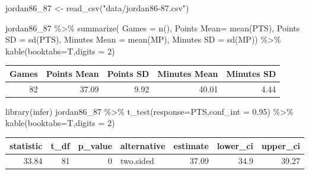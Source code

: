 \documentclass[
  11pt,
]{book}
\newenvironment{Shaded}{\begin{snugshade}}{\end{snugshade}}
\newcommand{\AttributeTok}[1]{\textcolor[rgb]{0.77,0.63,0.00}{#1}}
\newcommand{\DecValTok}[1]{\textcolor[rgb]{0.00,0.00,0.81}{#1}}
\newcommand{\FloatTok}[1]{\textcolor[rgb]{0.00,0.00,0.81}{#1}}
\newcommand{\FunctionTok}[1]{\textcolor[rgb]{0.00,0.00,0.00}{#1}}
\newcommand{\NormalTok}[1]{#1}
\newcommand{\OtherTok}[1]{\textcolor[rgb]{0.56,0.35,0.01}{#1}}
\newcommand{\SpecialCharTok}[1]{\textcolor[rgb]{0.00,0.00,0.00}{#1}}
\newcommand{\StringTok}[1]{\textcolor[rgb]{0.31,0.60,0.02}{#1}}
\theoremstyle{definition}
\theoremstyle{definition}
\theoremstyle{definition}
\theoremstyle{definition}
\theoremstyle{remark}
\begin{document}
\vfill

\newpage

\begin{Shaded}
\begin{Highlighting}[]
\NormalTok{jordan86\_87 }\OtherTok{\textless{}{-}} \FunctionTok{read\_csv}\NormalTok{(}\StringTok{"data/jordan86{-}87.csv"}\NormalTok{)}

\NormalTok{jordan86\_87 }\SpecialCharTok{\%\textgreater{}\%} \FunctionTok{summarize}\NormalTok{(}
  \AttributeTok{Games =} \FunctionTok{n}\NormalTok{(), }
  \StringTok{\textasciigrave{}}\AttributeTok{Points Mean}\StringTok{\textasciigrave{}}\OtherTok{=} \FunctionTok{mean}\NormalTok{(PTS),}
  \StringTok{\textasciigrave{}}\AttributeTok{Points SD}\StringTok{\textasciigrave{}} \OtherTok{=} \FunctionTok{sd}\NormalTok{(PTS),}
  \StringTok{\textasciigrave{}}\AttributeTok{Minutes Mean}\StringTok{\textasciigrave{}} \OtherTok{=} \FunctionTok{mean}\NormalTok{(MP),}
  \StringTok{\textasciigrave{}}\AttributeTok{Minutes SD}\StringTok{\textasciigrave{}} \OtherTok{=} \FunctionTok{sd}\NormalTok{(MP)) }\SpecialCharTok{\%\textgreater{}\%} 
  \FunctionTok{kable}\NormalTok{(}\AttributeTok{booktabs=}\NormalTok{T,}\AttributeTok{digits =} \DecValTok{2}\NormalTok{)}
\end{Highlighting}
\end{Shaded}

\begin{tabular}{rrrrr}
\toprule
Games & Points Mean & Points SD & Minutes Mean & Minutes SD\\
\midrule
82 & 37.09 & 9.92 & 40.01 & 4.44\\
\bottomrule
\end{tabular}
\bigskip

\begin{Shaded}
\begin{Highlighting}[]
\FunctionTok{library}\NormalTok{(infer)}
\NormalTok{jordan86\_87 }\SpecialCharTok{\%\textgreater{}\%} \FunctionTok{t\_test}\NormalTok{(}\AttributeTok{response=}\NormalTok{PTS,}\AttributeTok{conf\_int =} \FloatTok{0.95}\NormalTok{) }\SpecialCharTok{\%\textgreater{}\%} 
  \FunctionTok{kable}\NormalTok{(}\AttributeTok{booktabs=}\NormalTok{T,}\AttributeTok{digits =} \DecValTok{2}\NormalTok{)}
\end{Highlighting}
\end{Shaded}

\begin{tabular}{rrrlrrr}
\toprule
statistic & t\_df & p\_value & alternative & estimate & lower\_ci & upper\_ci\\
\midrule
33.84 & 81 & 0 & two.sided & 37.09 & 34.9 & 39.27\\
\bottomrule
\end{tabular}
\newpage
\end{document}
